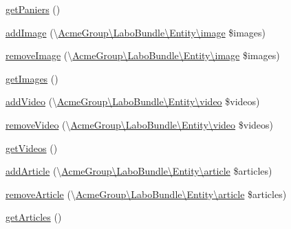 \begin{DoxyCompactItemize}
\hyperlink{class_acme_group_1_1_user_bundle_1_1_entity_1_1_user_a2a0340c05f11bfaac5cc8ebe3e2f0a07}{get\+Paniers} ()
\item 
\hyperlink{class_acme_group_1_1_user_bundle_1_1_entity_1_1_user_af48d16a06e155edc0c78fe856f28db4a}{add\+Image} (\textbackslash{}\hyperlink{class_acme_group_1_1_labo_bundle_1_1_entity_1_1image}{Acme\+Group\textbackslash{}\+Labo\+Bundle\textbackslash{}\+Entity\textbackslash{}image} \$images)
\item 
\hyperlink{class_acme_group_1_1_user_bundle_1_1_entity_1_1_user_ac5c517848de6f31e9e57ae8040628553}{remove\+Image} (\textbackslash{}\hyperlink{class_acme_group_1_1_labo_bundle_1_1_entity_1_1image}{Acme\+Group\textbackslash{}\+Labo\+Bundle\textbackslash{}\+Entity\textbackslash{}image} \$images)
\item 
\hyperlink{class_acme_group_1_1_user_bundle_1_1_entity_1_1_user_a1fe9e1ffc43cf63182ab3b2512e7182c}{get\+Images} ()
\item 
\hyperlink{class_acme_group_1_1_user_bundle_1_1_entity_1_1_user_a3a0fd818d1cef6bd996f9c632c20b7d0}{add\+Video} (\textbackslash{}\hyperlink{class_acme_group_1_1_labo_bundle_1_1_entity_1_1video}{Acme\+Group\textbackslash{}\+Labo\+Bundle\textbackslash{}\+Entity\textbackslash{}video} \$videos)
\item 
\hyperlink{class_acme_group_1_1_user_bundle_1_1_entity_1_1_user_af55a6d8b80a574920eb07f0dccda2bc7}{remove\+Video} (\textbackslash{}\hyperlink{class_acme_group_1_1_labo_bundle_1_1_entity_1_1video}{Acme\+Group\textbackslash{}\+Labo\+Bundle\textbackslash{}\+Entity\textbackslash{}video} \$videos)
\item 
\hyperlink{class_acme_group_1_1_user_bundle_1_1_entity_1_1_user_a16c66f9c33adeceb0b2d5605334c187b}{get\+Videos} ()
\item 
\hyperlink{class_acme_group_1_1_user_bundle_1_1_entity_1_1_user_aa734ab4895b598bf88fff806df01fdd1}{add\+Article} (\textbackslash{}\hyperlink{class_acme_group_1_1_labo_bundle_1_1_entity_1_1article}{Acme\+Group\textbackslash{}\+Labo\+Bundle\textbackslash{}\+Entity\textbackslash{}article} \$articles)
\item 
\hyperlink{class_acme_group_1_1_user_bundle_1_1_entity_1_1_user_a29fff821055aa6ca0a66e3fae1380e01}{remove\+Article} (\textbackslash{}\hyperlink{class_acme_group_1_1_labo_bundle_1_1_entity_1_1article}{Acme\+Group\textbackslash{}\+Labo\+Bundle\textbackslash{}\+Entity\textbackslash{}article} \$articles)
\item 
\hyperlink{class_acme_group_1_1_user_bundle_1_1_entity_1_1_user_aa5de41acac973e39a6355ee6a341048e}{get\+Articles} ()

\end{DoxyCompactItemize}
